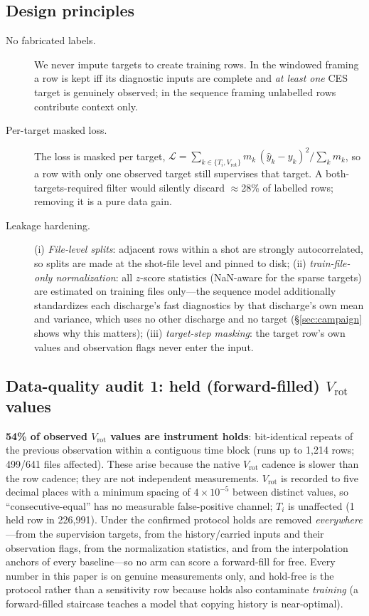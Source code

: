 \documentclass[10pt]{article}
\newcommand{\Ti}{\ensuremath{T_i}}
\newcommand{\Vrot}{\ensuremath{V_\mathrm{rot}}}
\begin{document}
\subsection{Design principles}
\begin{description}
  \item[No fabricated labels.] We never impute targets to create training rows. In
  the windowed framing a row is kept iff its diagnostic inputs are complete and
  \emph{at least one} CES target is genuinely observed; in the sequence framing
  unlabelled rows contribute context only.
  \item[Per-target masked loss.] The loss is masked per target,
  $\mathcal{L} = \sum_{k\in\{\Ti,\Vrot\}} m_k\,(\hat{y}_k-y_k)^2 / \sum_k m_k$,
  so a row with only one observed target still supervises that target. A
  both-targets-required filter would silently discard $\approx$28\% of labelled
  rows; removing it is a pure data gain.
  \item[Leakage hardening.] (i) \emph{File-level splits}: adjacent rows within a
  shot are strongly autocorrelated, so splits are made at the shot-file level and
  pinned to disk; (ii) \emph{train-file-only normalization}: all $z$-score
  statistics (NaN-aware for the sparse targets) are estimated on training files
  only---the sequence model additionally standardizes each discharge's fast
  diagnostics by that discharge's own mean and variance, which uses no other
  discharge and no target (\S\ref{sec:campaign} shows why this matters);
  (iii) \emph{target-step masking}: the target row's own values and observation
  flags never enter the input.
\end{description}

\subsection{Data-quality audit 1: held (forward-filled) \Vrot{} values}
\label{sec:stuck}
\textbf{54\% of observed \Vrot{} values are instrument holds}: bit-identical
repeats of the previous observation within a contiguous time block (runs up to
1{,}214 rows; 499/641 files affected). These arise because the native \Vrot{}
cadence is slower than the row cadence; they are not independent measurements.
\Vrot{} is recorded to five decimal places with a minimum spacing of
$4\times10^{-5}$ between distinct values, so ``consecutive-equal'' has no
measurable false-positive channel; \Ti{} is unaffected (1 held row in 226{,}991).
Under the confirmed protocol holds are removed \emph{everywhere}---from the
supervision targets, from the history/carried inputs and their observation flags,
from the normalization statistics, and from the interpolation anchors of every
baseline---so no arm can score a forward-fill for free. Every number in this paper
is on genuine measurements only, and hold-free is the protocol rather than a
sensitivity row because holds also contaminate \emph{training} (a forward-filled
staircase teaches a model that copying history is near-optimal).
\end{document}
